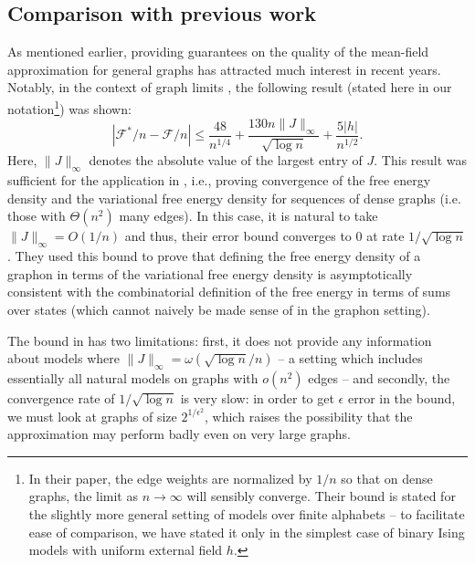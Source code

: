 \documentclass[final, 12pt]{colt2018}
\theoremstyle{definition}
\theoremstyle{plain}
\begin{document}
\subsection{Comparison with previous work}
\label{sec:previous-results}
As mentioned earlier, providing guarantees on the quality of the mean-field approximation for general graphs has attracted much interest in recent years. Notably, in the
context of graph limits \citep{borgs2012convergent}, the following result (stated here in our notation\footnote{In their paper, the edge weights are normalized by $1/n$ so that on dense graphs, the limit as $n \to \infty$ will sensibly converge. Their bound is stated for the slightly more general setting of models over finite alphabets -- to facilitate ease of comparison, we have stated it only in the simplest case of binary Ising models with uniform external field $h$.}) was shown:
\[ |\mathcal{F}^*/n - \mathcal{F}/n| \le \frac{48}{n^{1/4}} + \frac{130 n \|J\|_{\infty}}{\sqrt{\log n}} + \frac{5 |h|}{n^{1/2}}. \]
Here, $\|J\|_{\infty}$ denotes the absolute value of the largest entry of $J$. This result was sufficient for the application 
in \citep{borgs2012convergent}, i.e., proving convergence of the free energy
density and the variational free energy density for sequences of dense graphs (i.e. those with $\Theta(n^2)$
many edges). In this case, it is natural to take $\|J\|_{\infty} = O(1/n)$ and thus,
their error bound converges to 0 at rate $1/\sqrt{\log n}$. %
They used this
bound to prove that defining the free energy density of a graphon in terms
of the variational free energy density is asymptotically consistent with the combinatorial
definition of the free energy in terms of sums over states (which cannot naively be made sense of in the
graphon setting).

The bound in \citep{borgs2012convergent}
has two limitations: first, it does not provide any information about models where $\|J\|_{\infty} = \omega(\sqrt{\log n}/n)$ -- a setting which includes
essentially all natural models on graphs with $o(n^2)$ edges --
and secondly, the convergence rate of $1/\sqrt{\log n}$ is very slow: in order to get $\epsilon$
error in the bound, we must look at graphs of size $2^{1/\epsilon^2}$, which raises
the possibility that the approximation may perform badly even on very large graphs. 
\end{document}
